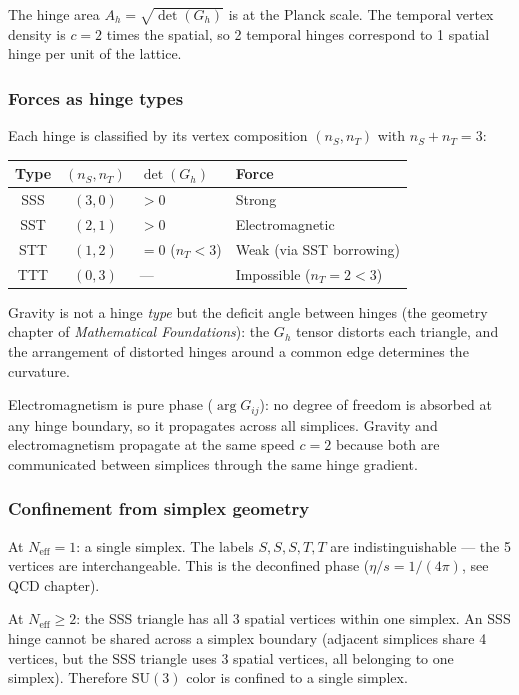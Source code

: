 \documentclass[12pt]{article}
\theoremstyle{remark}
\theoremstyle{definition}
\begin{document}
The hinge area $A_h = \sqrt{\det(G_h)}$ is at the Planck scale. The temporal vertex density is $c = 2$ times the spatial, so 2 temporal hinges correspond to 1 spatial hinge per unit of the lattice.

\subsubsection{Forces as hinge types}

Each hinge is classified by its vertex composition $(n_S, n_T)$ with $n_S + n_T = 3$:

\begin{center}
\begin{tabular}{ccll}
\hline
Type & $(n_S, n_T)$ & $\det(G_h)$ & Force \\
\hline
SSS & $(3,0)$ & $> 0$ & Strong \\
SST & $(2,1)$ & $> 0$ & Electromagnetic \\
STT & $(1,2)$ & $= 0$ ($n_T < 3$) & Weak (via SST borrowing) \\
TTT & $(0,3)$ & --- & Impossible ($n_T = 2 < 3$) \\
\hline
\end{tabular}
\end{center}

Gravity is not a hinge \emph{type} but the deficit angle between hinges (the geometry chapter of \textit{Mathematical Foundations}): the $G_h$ tensor distorts each triangle, and the arrangement of distorted hinges around a common edge determines the curvature.

Electromagnetism is pure phase ($\arg G_{ij}$): no degree of freedom is absorbed at any hinge boundary, so it propagates across all simplices. Gravity and electromagnetism propagate at the same speed $c = 2$ because both are communicated between simplices through the same hinge gradient.

\subsubsection{Confinement from simplex geometry}

At $N_\text{eff} = 1$: a single simplex. The labels $S, S, S, T, T$ are indistinguishable --- the 5 vertices are interchangeable. This is the deconfined phase ($\eta/s = 1/(4\pi)$, see QCD chapter).

At $N_\text{eff} \geq 2$: the SSS triangle has all 3 spatial vertices within one simplex. An SSS hinge cannot be shared across a simplex boundary (adjacent simplices share 4 vertices, but the SSS triangle uses 3 spatial vertices, all belonging to one simplex). Therefore $\text{SU}(3)$ color is confined to a single simplex.
\end{document}
